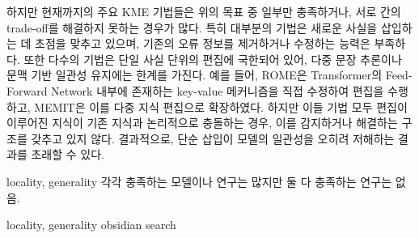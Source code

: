 \documentclass[a4paper,fleqn]{cas-sc}
\begin{document}
하지만 현재까지의 주요 KME 기법들은 위의 목표 중 일부만 충족하거나, 서로 간의 trade-off를 해결하지 못하는 경우가 많다. 특히 대부분의 기법은 새로운 사실을 삽입하는 데 초점을 맞추고 있으며, 기존의 오류 정보를 제거하거나 수정하는 능력은 부족하다. 또한 다수의 기법은 단일 사실 단위의 편집에 국한되어 있어, 다중 문장 추론이나 문맥 기반 일관성 유지에는 한계를 가진다.
예를 들어, ROME은 Transformer의 Feed-Forward Network 내부에 존재하는 key-value 메커니즘을 직접 수정하여 편집을 수행하고, MEMIT은 이를 다중 지식 편집으로 확장하였다. 하지만 이들 기법 모두 편집이 이루어진 지식이 기존 지식과 논리적으로 충돌하는 경우, 이를 감지하거나 해결하는 구조를 갖추고 있지 않다. 결과적으로, 단순 삽입이 모델의 일관성을 오히려 저해하는 결과를 초래할 수 있다.


locality, generality 각각 충족하는 모델이나 연구는 많지만 둘 다 충족하는 연구는 없음.

locality, generality obsidian search


























\end{document}

